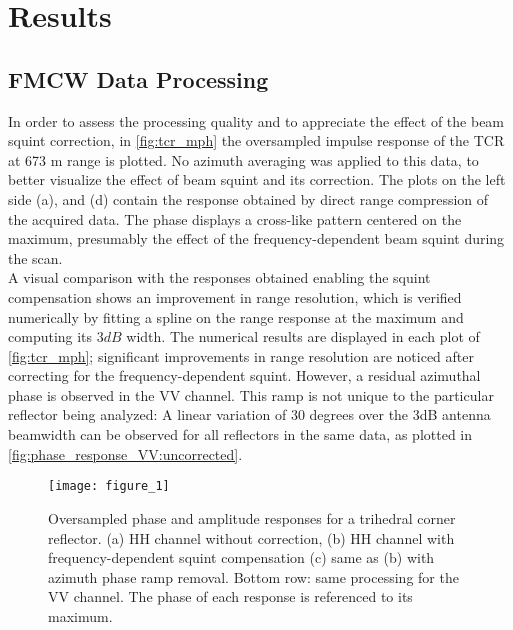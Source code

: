 \section{Results}\label{sec:results}
\subsection{FMCW Data Processing}\label{sec:res_SLC}
In order to assess the processing quality and to appreciate the effect of the beam squint correction, in  \autoref{fig:tcr_mph} the oversampled impulse response of the TCR at 673 m range is plotted. No azimuth averaging was applied to this data, to better visualize the effect of beam squint and its correction. The plots on the left side (a), and (d) contain the response obtained by direct range compression of the acquired data. The phase displays a cross-like pattern centered on the maximum, presumably the effect of the frequency-dependent beam squint during the scan.\\ A visual comparison with the responses obtained enabling the squint compensation shows an improvement in range resolution, which is verified numerically by fitting a spline on the range response at the maximum and computing its $3 dB$ width. The numerical results are displayed in each plot of \autoref{fig:tcr_mph}; significant improvements in range resolution are noticed after correcting for the frequency-dependent squint. However, a residual azimuthal phase is observed in the VV channel. This ramp is not unique to the particular reflector being analyzed: A linear variation of 30 degrees over the 3dB antenna beamwidth can be observed for all reflectors in the same data, as plotted in \autoref{fig:phase_response_VV:uncorrected}.
\begin{figure*}[ht]
	\centering
	\texttt{[image: figure\_1]}
	\caption{Oversampled phase and amplitude responses for a trihedral corner reflector. (a) HH channel without correction, (b) HH channel with frequency-dependent squint compensation (c) same as (b) with azimuth phase ramp removal. Bottom row: same processing for the VV channel.
	The phase of each response is referenced to its maximum.}
	\label{fig:tcr_mph}
\end{figure*}

